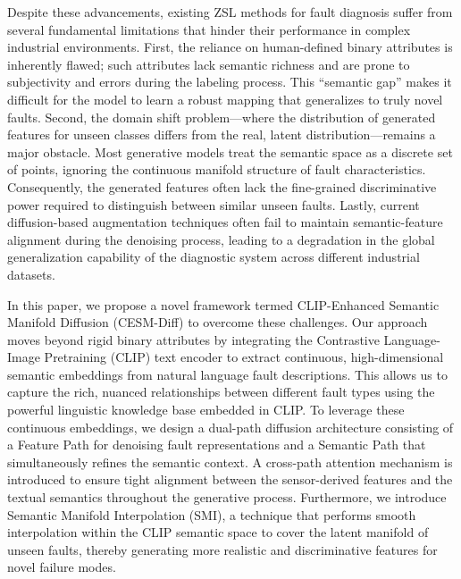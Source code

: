\documentclass[journal,12pt,onecolumn]{IEEEtran}
\begin{document}
Despite these advancements, existing ZSL methods for fault diagnosis suffer from several fundamental limitations that hinder their performance in complex industrial environments. First, the reliance on human-defined binary attributes is inherently flawed; such attributes lack semantic richness and are prone to subjectivity and errors during the labeling process. This ``semantic gap'' makes it difficult for the model to learn a robust mapping that generalizes to truly novel faults. Second, the domain shift problem—where the distribution of generated features for unseen classes differs from the real, latent distribution—remains a major obstacle. Most generative models treat the semantic space as a discrete set of points, ignoring the continuous manifold structure of fault characteristics. Consequently, the generated features often lack the fine-grained discriminative power required to distinguish between similar unseen faults. Lastly, current diffusion-based augmentation techniques often fail to maintain semantic-feature alignment during the denoising process, leading to a degradation in the global generalization capability of the diagnostic system across different industrial datasets.

In this paper, we propose a novel framework termed CLIP-Enhanced Semantic Manifold Diffusion (CESM-Diff) to overcome these challenges. Our approach moves beyond rigid binary attributes by integrating the Contrastive Language-Image Pretraining (CLIP) text encoder to extract continuous, high-dimensional semantic embeddings from natural language fault descriptions. This allows us to capture the rich, nuanced relationships between different fault types using the powerful linguistic knowledge base embedded in CLIP. To leverage these continuous embeddings, we design a dual-path diffusion architecture consisting of a Feature Path for denoising fault representations and a Semantic Path that simultaneously refines the semantic context. A cross-path attention mechanism is introduced to ensure tight alignment between the sensor-derived features and the textual semantics throughout the generative process. Furthermore, we introduce Semantic Manifold Interpolation (SMI), a technique that performs smooth interpolation within the CLIP semantic space to cover the latent manifold of unseen faults, thereby generating more realistic and discriminative features for novel failure modes.
\end{document}
